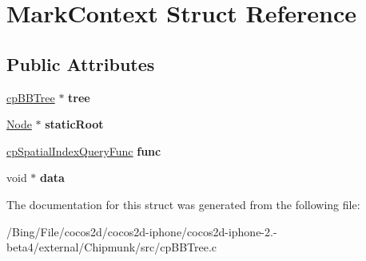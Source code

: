 \hypertarget{struct_mark_context}{\section{Mark\-Context Struct Reference}
\label{struct_mark_context}
}
\subsection*{Public Attributes}
\begin{DoxyCompactItemize}
\item 
\hypertarget{struct_mark_context_ac056c6d3015a4d5d904ee669569f0bf7}{\hyperlink{structcp_b_b_tree}{cp\-B\-B\-Tree} $\ast$ {\bfseries tree}}\label{struct_mark_context_ac056c6d3015a4d5d904ee669569f0bf7}

\item 
\hypertarget{struct_mark_context_ae71a1449ebb0640c8f1cc2d3b11a667d}{\hyperlink{struct_node}{Node} $\ast$ {\bfseries static\-Root}}\label{struct_mark_context_ae71a1449ebb0640c8f1cc2d3b11a667d}

\item 
\hypertarget{struct_mark_context_a2f9dd9226b8b3be0ff466cb7ccb4cef3}{\hyperlink{group__cp_spatial_index_ga4885d6b7a5f9f613a19a25e1c7ec5073}{cp\-Spatial\-Index\-Query\-Func} {\bfseries func}}\label{struct_mark_context_a2f9dd9226b8b3be0ff466cb7ccb4cef3}

\item 
\hypertarget{struct_mark_context_a82536766810698d4e2ea28e766c18294}{void $\ast$ {\bfseries data}}\label{struct_mark_context_a82536766810698d4e2ea28e766c18294}

\end{DoxyCompactItemize}


The documentation for this struct was generated from the following file\-:\begin{DoxyCompactItemize}
\item 
/\-Bing/\-File/cocos2d/cocos2d-\/iphone/cocos2d-\/iphone-\/2.-\/beta4/external/\-Chipmunk/src/cp\-B\-B\-Tree.\-c\end{DoxyCompactItemize}
